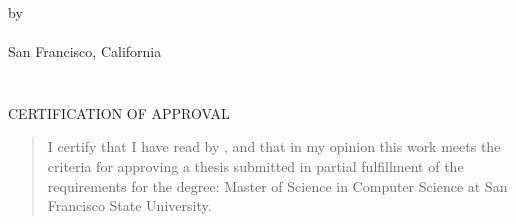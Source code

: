 \documentclass[12pt,oneside]{sfsuthesis}
\theoremstyle{plain} %
\theoremstyle{definition}  %
\theoremstyle{remark}  %
\begin{document}
\thispagestyle{empty}

\[ \]
\vspace{-1.8in}

\begin{center}
{\mytitle}

\vspace{1.4in}


\vspace{.5in}


\vspace*{\fill}

{by \\[12pt] 
\myname \\[12pt]
San Francisco, California\\[12pt]
\thismonth
\thisyear}
\end{center}

\newpage
\thispagestyle{empty}

$\mbox{}$
\vspace{3in}
\begin{center}
\end{center}

\newpage
\thispagestyle{empty}
\[ \]
\vspace{-1.8in}
\begin{center}
{CERTIFICATION OF APPROVAL}
\end{center}
\vspace{.5in}
\begin{quote}
I certify that I have read {\it \mytitle} by \myname, and that in my opinion
this work meets the criteria for approving a thesis submitted in partial
fulfillment of the requirements for the degree: Master of Science in Computer
Science at San Francisco State University.
\end{quote}
\end{document}
